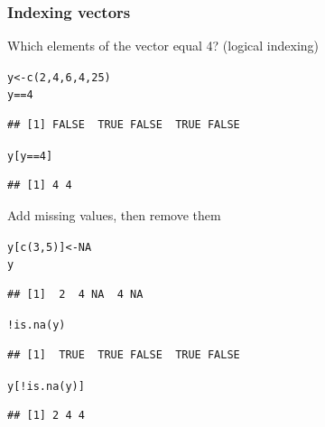 \documentclass[color=usenames,dvipsnames]{beamer}\usepackage[]{graphicx}\usepackage[]{color}
\makeatletter
\newcommand{\hlnum}[1]{\textcolor[rgb]{0.69,0.494,0}{#1}}%
\newcommand{\hlopt}[1]{\textcolor[rgb]{0,0,0}{#1}}%
\newcommand{\hlstd}[1]{\textcolor[rgb]{0,0,0}{#1}}%
\newcommand{\hlkwb}[1]{\textcolor[rgb]{0,0.341,0.682}{#1}}%
\newcommand{\hlkwd}[1]{\textcolor[rgb]{0.004,0.004,0.506}{#1}}%
\newenvironment{kframe}{%
 \def\at@end@of@kframe{}%
 \ifinner\ifhmode%
  \def\at@end@of@kframe{\end{minipage}}%
  \begin{minipage}{\columnwidth}%
 \fi\fi%
 \def\FrameCommand##1{\hskip\@totalleftmargin \hskip-\fboxsep
 \colorbox{shadecolor}{##1}\hskip-\fboxsep
     \hskip-\linewidth \hskip-\@totalleftmargin \hskip\columnwidth}%
 \MakeFramed {\advance\hsize-\width
   \@totalleftmargin\z@ \linewidth\hsize
   \@setminipage}}%
 {\par\unskip\endMakeFramed%
 \at@end@of@kframe}
\newenvironment{knitrout}{}{} %
\makeatother
\begin{document}
\begin{frame}[fragile]
  \frametitle{Indexing vectors}
  \small
  Which elements of the vector equal 4? (logical indexing)
\begin{knitrout}\small
{}\color{fgcolor}\begin{kframe}
\begin{alltt}
\hlstd{y} \hlkwb{<-} \hlkwd{c}\hlstd{(}\hlnum{2}\hlstd{,} \hlnum{4}\hlstd{,} \hlnum{6}\hlstd{,} \hlnum{4}\hlstd{,} \hlnum{25}\hlstd{)}
\hlstd{y} \hlopt{==} \hlnum{4}
\end{alltt}
\begin{verbatim}
## [1] FALSE  TRUE FALSE  TRUE FALSE
\end{verbatim}
\begin{alltt}
\hlstd{y[y} \hlopt{==} \hlnum{4}\hlstd{]}
\end{alltt}
\begin{verbatim}
## [1] 4 4
\end{verbatim}
\end{kframe}
\end{knitrout}
\pause \vfill
Add missing values, then remove them
\begin{knitrout}\small
{}\color{fgcolor}\begin{kframe}
\begin{alltt}
\hlstd{y[}\hlkwd{c}\hlstd{(}\hlnum{3}\hlstd{,}\hlnum{5}\hlstd{)]} \hlkwb{<-} \hlnum{NA}
\hlstd{y}
\end{alltt}
\begin{verbatim}
## [1]  2  4 NA  4 NA
\end{verbatim}
\end{kframe}
\end{knitrout}
\pause \vfill
\begin{knitrout}\small
{}\color{fgcolor}\begin{kframe}
\begin{alltt}
\hlopt{!}\hlkwd{is.na}\hlstd{(y)}
\end{alltt}
\begin{verbatim}
## [1]  TRUE  TRUE FALSE  TRUE FALSE
\end{verbatim}
\begin{alltt}
\hlstd{y[}\hlopt{!}\hlkwd{is.na}\hlstd{(y)]}
\end{alltt}
\begin{verbatim}
## [1] 2 4 4
\end{verbatim}
\end{kframe}
\end{knitrout}
\end{frame}
\end{document}
